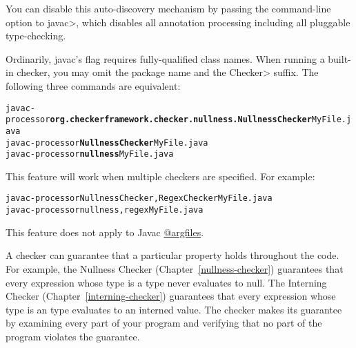 You can disable this auto-discovery mechanism by passing the
 command-line option to \<javac>, which disables all
annotation processing including all pluggable type-checking.




Ordinarily, javac's  flag requires fully-qualified class names.
When running a built-in checker, you may
omit the package name and the \<Checker> suffix.
The following three commands are equivalent:

\begin{alltt}
  javac -processor \textbf{org.checkerframework.checker.nullness.NullnessChecker} MyFile.java
  javac -processor \textbf{NullnessChecker} MyFile.java
  javac -processor \textbf{nullness} MyFile.java
\end{alltt}

This feature will work when multiple checkers are specified.
For example:

\begin{alltt}
  javac -processor NullnessChecker,RegexChecker MyFile.java
  javac -processor nullness,regex MyFile.java
\end{alltt}

This feature does not apply to Javac \href{https://docs.oracle.com/javase/8/docs/technotes/tools/windows/javac.html#BHCJEIBB}{@argfiles}.



A checker can guarantee that a particular property holds throughout the
code.  For example, the Nullness Checker (Chapter~\ref{nullness-checker})
guarantees that every expression whose type is a  type never
evaluates to null.  The Interning Checker (Chapter~\ref{interning-checker})
guarantees that every expression whose type is an  type
evaluates to an interned value.  The checker makes its guarantee by
examining every part of your program and verifying that no part of the
program violates the guarantee.

